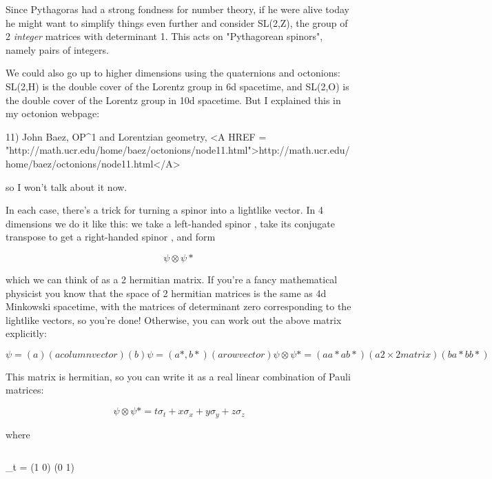 Since Pythagoras had a strong fondness for number theory, if he 
were alive today he might want to simplify things even further 
and consider SL(2,Z), the group of 2 \emph{integer} matrices with 
determinant 1.  This acts on "Pythagorean spinors", namely pairs 
of integers.

We could also go up to higher dimensions using the quaternions
and octonions: SL(2,H) is the double cover of the Lorentz
group in 6d spacetime, and SL(2,O) is the double cover of the
Lorentz group in 10d spacetime.  But I explained this in my
octonion webpage:

11) John Baez, OP^{1} and Lorentzian geometry, 
<A HREF = "http://math.ucr.edu/home/baez/octonions/node11.html">http://math.ucr.edu/home/baez/octonions/node11.html</A>

so I won't talk about it now.

In each case, there's a trick for turning a spinor into a 
lightlike vector.  In 4 dimensions we do it like this: we 
take a left-handed spinor \psi , take its conjugate transpose 
to get a right-handed spinor \psi *, and form 


$$

\psi  \otimes  \psi *
$$
    
which we can think of as a 2 hermitian matrix.   If you're
a fancy mathematical physicist you know that the space of 
2 hermitian matrices is the same as 4d Minkowski spacetime, 
with the matrices of determinant zero corresponding to the 
lightlike vectors, so you're done!  Otherwise, you can work 
out the above matrix explicitly:


$$

\psi  = (a)                                         (a column vector)
    (b)

\psi  = (a*, b*)                                    (a row vector)


\psi  \otimes  \psi * = (aa* ab*)                              (a 2\times 2 matrix)
         (ba* bb*)                  
$$
    
This matrix is hermitian, so you can write it as a real 
linear combination of Pauli matrices:


$$

\psi  \otimes  \psi * = t \sigma _{t} + x \sigma _{x} + y \sigma _{y} + z \sigma _{z}
$$
    
where


$$

\sigma _{t} = (1  0)
     (0  1)

